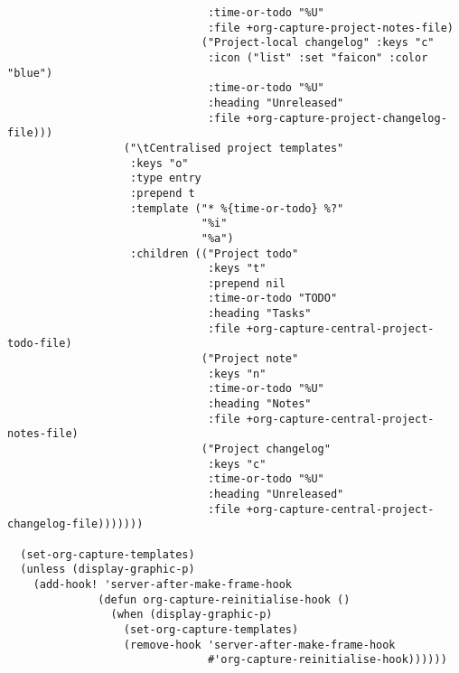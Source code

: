 \documentclass[c]{article}
\theoremstyle{plain}%
\theoremstyle{definition}
\theoremstyle{remark}
\begin{document}
\begin{verbatim}
                               :time-or-todo "%U"
                               :file +org-capture-project-notes-file)
                              ("Project-local changelog" :keys "c"
                               :icon ("list" :set "faicon" :color "blue")
                               :time-or-todo "%U"
                               :heading "Unreleased"
                               :file +org-capture-project-changelog-file)))
                  ("\tCentralised project templates"
                   :keys "o"
                   :type entry
                   :prepend t
                   :template ("* %{time-or-todo} %?"
                              "%i"
                              "%a")
                   :children (("Project todo"
                               :keys "t"
                               :prepend nil
                               :time-or-todo "TODO"
                               :heading "Tasks"
                               :file +org-capture-central-project-todo-file)
                              ("Project note"
                               :keys "n"
                               :time-or-todo "%U"
                               :heading "Notes"
                               :file +org-capture-central-project-notes-file)
                              ("Project changelog"
                               :keys "c"
                               :time-or-todo "%U"
                               :heading "Unreleased"
                               :file +org-capture-central-project-changelog-file)))))))

  (set-org-capture-templates)
  (unless (display-graphic-p)
    (add-hook! 'server-after-make-frame-hook
              (defun org-capture-reinitialise-hook ()
                (when (display-graphic-p)
                  (set-org-capture-templates)
                  (remove-hook 'server-after-make-frame-hook
                               #'org-capture-reinitialise-hook))))))
\end{verbatim}
\end{document}
